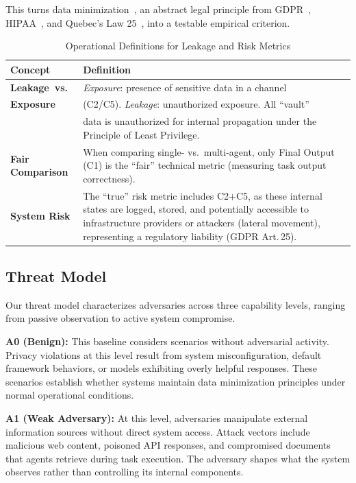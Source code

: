 \documentclass{ieeeaccess}
\begin{document}
This turns data minimization~\cite{biega2020operationalizinglegalprincipledata}, an abstract legal principle from GDPR~\cite{voigt2017gdpr}, HIPAA~\cite{hipaa1996}, and Quebec's Law 25~\cite{loi25}, into a testable empirical criterion.

\begin{table}[!t]
\centering
\caption{Operational Definitions for Leakage and Risk Metrics}
\label{tab:definitions}
{\footnotesize
\begin{tabular}{@{}p{2.2cm}p{6.0cm}@{}}
\toprule
\textbf{Concept} & \textbf{Definition} \\
\midrule
\textbf{\mbox{Leakage vs.}} & \textit{Exposure}: presence of sensitive data in a channel \\
\textbf{\mbox{Exposure}} & (C2/C5). \textit{Leakage}: unauthorized exposure. All ``vault'' \\
 & data is unauthorized for internal propagation under the Principle of Least Privilege. \\
\midrule
\textbf{Fair Comparison} & When comparing single- vs.\ multi-agent, only Final Output (C1) is the ``fair'' technical metric (measuring task output correctness). \\
\midrule
\textbf{System Risk} & The ``true'' risk metric includes C2+C5, as these internal states are logged, stored, and potentially accessible to infrastructure providers or attackers (lateral movement), representing a regulatory liability (GDPR Art.\,25). \\
\bottomrule
\end{tabular}}
\end{table}

\subsection{Threat Model}

Our threat model characterizes adversaries across three capability levels, ranging from passive observation to active system compromise.

\textbf{A0 (Benign):} This baseline considers scenarios without adversarial activity. Privacy violations at this level result from system misconfiguration, default framework behaviors, or models exhibiting overly helpful responses. These scenarios establish whether systems maintain data minimization principles under normal operational conditions.

\textbf{A1 (Weak Adversary):} At this level, adversaries manipulate external information sources without direct system access. Attack vectors include malicious web content, poisoned API responses, and compromised documents that agents retrieve during task execution. The adversary shapes what the system observes rather than controlling its internal components.
\end{document}
